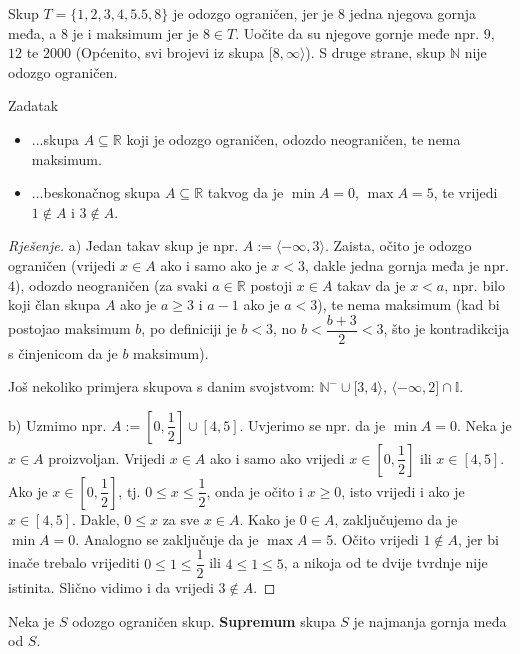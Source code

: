 \begin{exmp}
Skup \(T=\{1, 2, 3, 4, 5.5, 8\}\) je odozgo ograničen, jer je \(8\) jedna njegova gornja međa, a \(8\) je i maksimum jer je \(8\in T\). Uočite da su njegove gornje međe npr. \(9\), \(12\) te \(2000\) (Općenito, svi brojevi iz skupa \([8,\infty\rangle\)). S druge strane, skup \(\mathbb{N}\) nije odozgo ograničen.
\end{exmp}
\begin{exercise}{Zadatak} \textbf{}
\begin{itemize}
\item[a)] ...skupa \(A\subseteq \mathbb{R}\) koji je odozgo ograničen, odozdo neograničen, te nema maksimum.
\item[b)] ...beskonačnog skupa \(A\subseteq \mathbb{R}\) takvog da je \(\min{A}=0\), \(\max{A}=5\), te vrijedi \(1\notin A\) i \(3\notin A\).
\end{itemize}
\end{exercise}
\begin{proof}[Rješenje]
a) Jedan takav skup je npr. \(A:=\langle -\infty, 3\rangle\). Zaista, očito je odozgo ograničen (vrijedi \(x\in A\) ako i samo ako je \(x<3\), dakle jedna gornja međa je npr. \(4\)), odozdo neograničen (za svaki \(a\in \mathbb{R}\) postoji \(x\in A\) takav da je \(x<a\), npr. bilo koji član skupa \(A\) ako je \(a\geq 3\) i \(a-1\) ako je \(a<3\)), te nema maksimum (kad bi postojao maksimum \(b\), po definiciji je \(b<3\), no \(b<\dfrac{b+3}{2}<3\), što je kontradikcija s činjenicom da je \(b\) maksimum).

Još nekoliko primjera skupova s danim svojstvom: \(\mathbb{N}^-\cup [3, 4\rangle\), \(\langle -\infty, 2]\cap \mathbb{I}\).

b) Uzmimo npr. \(A:=\left[0,\dfrac{1}{2}\right]\cup \left[4, 5\right]\). Uvjerimo se npr. da je \(\min{A}=0\). Neka je \(x\in A\) proizvoljan. Vrijedi \(x\in A\) ako i samo ako vrijedi \(x\in \left[0,\dfrac{1}{2}\right]\) ili \(x\in [4, 5]\). Ako je \(x\in \left[0,\dfrac{1}{2}\right]\), tj. \(0\leq x\leq \dfrac{1}{2}\), onda je očito i \(x\geq 0\), isto vrijedi i ako je \(x\in [4, 5]\). Dakle, \(0\leq x\) za sve \(x\in A\). Kako je \(0\in A\), zaključujemo da je \(\min{A}=0\). Analogno se zaključuje da je \(\max{A}=5\). Očito vrijedi \(1\notin A\), jer bi inače trebalo vrijediti \(0\leq 1\leq \dfrac{1}{2}\) ili \(4\leq 1\leq 5\), a nikoja od te dvije tvrdnje nije istinita. Slično vidimo i da vrijedi \(3\notin A\).
\end{proof}
\begin{definition}
Neka je \(S\) odozgo ograničen skup. \textbf{Supremum} skupa \(S\) je najmanja gornja međa od \(S\).
\end{definition}

